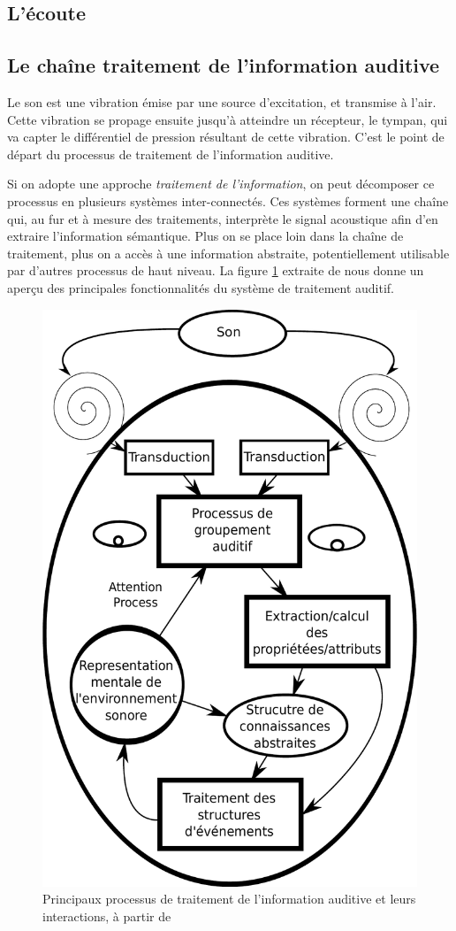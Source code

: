 \subsection{L'écoute}

\subsection{Le chaîne traitement de l'information auditive}
\label{sec:chaineTaite}

Le son est une vibration émise par une source d'excitation, et transmise à l'air. Cette vibration se propage ensuite jusqu'à atteindre un récepteur, le tympan, qui va capter le différentiel de pression résultant de cette vibration. C'est le point de départ du processus de traitement de l'information auditive. 

Si on adopte une approche \emph{traitement de l'information}, on peut décomposer ce processus en plusieurs systèmes inter-connectés. Ces systèmes forment une chaîne qui, au fur et à mesure des traitements, interprète le signal acoustique afin d'en extraire l'information sémantique. Plus on se place loin dans la chaîne de traitement, plus on a accès à une information abstraite, potentiellement utilisable par d'autres processus de haut niveau. La figure \ref{fig:traitementSonMcAdamsBigand} extraite de \citep{mcadams1994penser} nous donne un aperçu des principales fonctionnalités du système de traitement auditif.

\begin{figure}[bth]
        \myfloatalign
        \includegraphics[width=.6\linewidth]{gfx/traitementSonMcAdamsBigand}
        \caption[Principaux processus de traitement de l'information auditive et leurs interactions]{Principaux processus de traitement de l'information auditive et leurs interactions, à partir de \citep{mcadams1994penser}}\label{fig:traitementSonMcAdamsBigand}
\end{figure}

